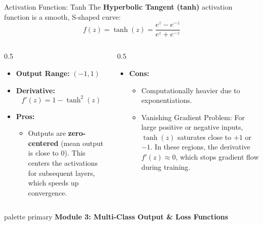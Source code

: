 \documentclass[9pt]{beamer}
\begin{document}
\begin{frame}{Activation Function: Tanh}
  The \textbf{Hyperbolic Tangent (tanh)} activation function is a smooth, S-shaped curve:
  $$f(z) = \tanh(z) = \frac{e^z - e^{-z}}{e^z + e^{-z}}$$
  \begin{columns}
    \begin{column}{0.5\textwidth}
      \begin{itemize}
        \item \textbf{Output Range:} $(-1, 1)$
        \item \textbf{Derivative:}
          $$f'(z) = 1 - \tanh^2(z)$$
        \item \textbf{Pros:}
          \begin{itemize}
            \item Outputs are \textbf{zero-centered} (mean output is close to 0). This centers the activations for subsequent layers, which speeds up convergence.
          \end{itemize}
      \end{itemize}
    \end{column}
    \begin{column}{0.5\textwidth}
      \begin{itemize}
        \item \textbf{Cons:}
          \begin{itemize}
            \item Computationally heavier due to exponentiations.
            \item \alert{Vanishing Gradient Problem:} For large positive or negative inputs, $\tanh(z)$ saturates close to $+1$ or $-1$. In these regions, the derivative $f'(z) \approx 0$, which stops gradient flow during training.
          \end{itemize}
      \end{itemize}
    \end{column}
  \end{columns}
\end{frame}

\begin{frame}[plain]
  \vfill
  \centering
  \begin{beamercolorbox}[sep=8pt,center,shadow=true,rounded=true]{palette primary}
    \textbf{Module 3: Multi-Class Output \& Loss Functions}
  \end{beamercolorbox}
  \vfill
\end{frame}
\end{document}
